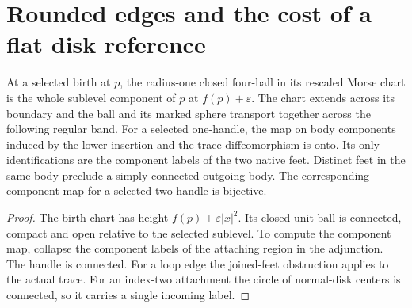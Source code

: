 \section{Rounded edges and the cost of a flat disk reference}
\label{sec:ed03-rounded-edges}

\begin{theorem}
\label{thm:ed03-birth-edge-incidence}
\leanok
At a selected birth at $p$, the radius-one closed four-ball in its rescaled
Morse chart is the whole sublevel component of $p$ at $f(p)+\varepsilon$.
The chart extends across its boundary and the ball and its marked sphere
transport together across the following regular band.
For a selected one-handle, the map on body components induced by the lower
insertion and the trace diffeomorphism is onto. Its only identifications are
the component labels of the two native feet. Distinct feet in the same body
preclude a simply connected outgoing body. The corresponding component map
for a selected two-handle is bijective.
\end{theorem}
\begin{proof}
\leanok
The birth chart has height $f(p)+\varepsilon |x|^2$. Its closed unit ball
is connected, compact and open relative to the selected sublevel. To compute
the component map, collapse the component labels of the attaching region
in the adjunction. The handle is connected. For a loop edge the joined-feet
obstruction applies to the actual trace. For an index-two attachment the circle
of normal-disk centers is connected, so it carries a single incoming label.
\end{proof}

